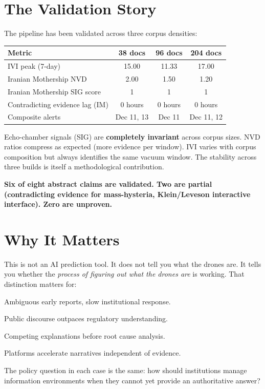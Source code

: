 \documentclass[11pt, letterpaper]{article}
\begin{document}
\section{The Validation Story}

The pipeline has been validated across three corpus densities:

\begin{table}[h]
\centering
\begin{tabular}{@{}lccc@{}}
  \toprule
  \textbf{Metric} & \textbf{38 docs} & \textbf{96 docs} & \textbf{204 docs} \\
  \midrule
  IVI peak (7-day)                  & 15.00   & 11.33   & 17.00   \\
  Iranian Mothership NVD            & 2.00    & 1.50    & 1.20    \\
  Iranian Mothership SIG score      & 1       & 1       & 1       \\
  Contradicting evidence lag (IM)   & 0 hours & 0 hours & 0 hours \\
  Composite alerts                  & Dec 11, 13 & Dec 11 & Dec 11, 12 \\
  \bottomrule
\end{tabular}
\end{table}

Echo-chamber signals (SIG) are \textbf{completely invariant} across corpus sizes.
NVD ratios compress as expected (more evidence per window).
IVI varies with corpus composition but always identifies the same vacuum window.
The stability across three builds is itself a methodological contribution.

\textbf{Six of eight abstract claims are validated.
Two are partial (contradicting evidence for mass-hysteria, Klein/Leveson interactive interface).
Zero are unproven.}


\section{Why It Matters}

This is not an AI prediction tool.
It does not tell you what the drones are.
It tells you whether the \emph{process of figuring out what the drones are} is working.
That distinction matters for:

\begin{description}[style=nextline, leftmargin=1.5em]
  \item[Biosecurity] Ambiguous early reports, slow institutional response.
  \item[Emerging technology governance] Public discourse outpaces regulatory understanding.
  \item[Critical infrastructure] Competing explanations before root cause analysis.
  \item[Algorithmic amplification] Platforms accelerate narratives independent of evidence.
\end{description}

The policy question in each case is the same: how should institutions manage information environments when they cannot yet provide an authoritative answer?
\end{document}
